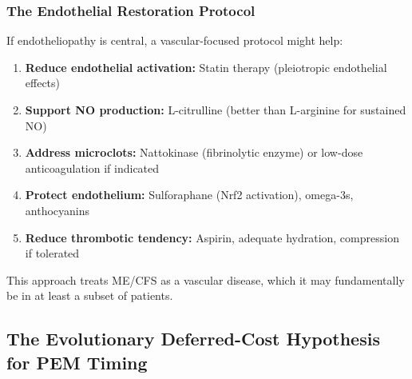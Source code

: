 \subsubsection{The Endothelial Restoration Protocol}

\begin{speculation}
If endotheliopathy is central, a vascular-focused protocol might help:

\begin{enumerate}
    \item \textbf{Reduce endothelial activation:} Statin therapy (pleiotropic endothelial effects)
    \item \textbf{Support NO production:} L-citrulline (better than L-arginine for sustained NO)
    \item \textbf{Address microclots:} Nattokinase (fibrinolytic enzyme) or low-dose anticoagulation if indicated
    \item \textbf{Protect endothelium:} Sulforaphane (Nrf2 activation), omega-3s, anthocyanins
    \item \textbf{Reduce thrombotic tendency:} Aspirin, adequate hydration, compression if tolerated
\end{enumerate}

This approach treats ME/CFS as a vascular disease, which it may fundamentally be in at least a subset of patients.
\end{speculation}

\subsection{The Evolutionary Deferred-Cost Hypothesis for PEM Timing}
\label{sec:evolutionary-deferred-cost}


